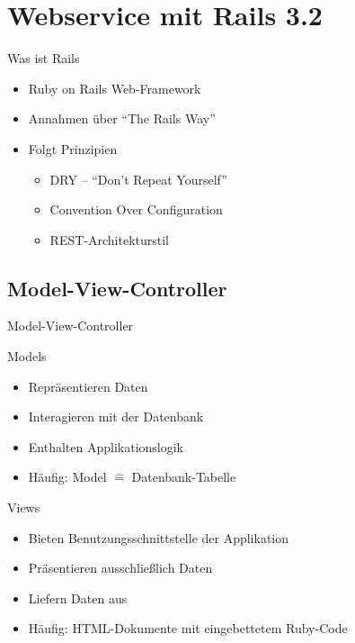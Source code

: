\lstset{
  language=Ruby,
  gobble=4,
  basicstyle=\ttfamily\small
}

\section[Webservice]{Webservice mit Rails 3.2}

\begin{Frame}{Was ist Rails}
  \begin{itemize}
    \item Ruby on Rails Web-Framework
    \item Annahmen über \enquote{The Rails Way}
    \item Folgt Prinzipien
    \begin{itemize}
      \item DRY -- \enquote{Don’t Repeat Yourself}
      \item Convention Over Configuration
      \item REST-Architekturstil
    \end{itemize}
  \end{itemize}
\end{Frame}

\subsection{Model-View-Controller}

\begin{frame}[fragile]{Model-View-Controller}
  \begin{center}
    
  \end{center}
\end{frame}

\begin{Frame}{Models}
  \begin{itemize}
    \item Repräsentieren Daten
    \item Interagieren mit der Datenbank
    \item Enthalten Applikationslogik
    \item Häufig: Model $\hat =$ Datenbank-Tabelle
  \end{itemize}
\end{Frame}

\begin{Frame}{Views}
  \begin{itemize}
    \item Bieten Benutzungsschnittstelle der Applikation
    \item Präsentieren ausschließlich Daten
    \item Liefern Daten aus
    \item Häufig: HTML-Dokumente mit eingebettetem Ruby-Code
  \end{itemize}
\end{Frame}

